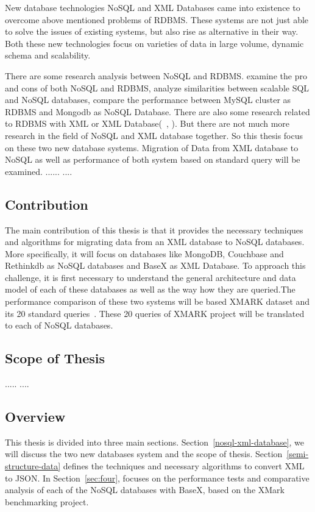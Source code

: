 \documentclass[a4paper,12pt]{article}
\begin{document}
			New database technologies  NoSQL and  XML Databases came into existence to overcome above mentioned problems of RDBMS. These systems are not just able to solve the issues of existing systems, but also rise as alternative in their way. Both these new technologies focus on varieties of data in large volume, dynamic schema and scalability.
			
			There are some research analysis between NoSQL and RDBMS. \cite{nance2013nosql} examine the pro and cons of both NoSQL and RDBMS, \cite{cattell2011scalable} analyze similarities between scalable SQL and NoSQL databases, \cite{hadjigeorgiou2013rdbms}  compare the performance between MySQL cluster as RDBMS and Mongodb as NoSQL Database.  There are also some research related to RDBMS with XML or XML Database(~\citet{jiang2002xparent}, \citet{shanmugasundaram1999relational}). But there are not much more research in the field of NoSQL and XML database together. So this thesis focus on these two new database systems. Migration of Data from XML database to NoSQL as well as performance of both system based on standard query will be examined.
			......
			....
	
	\subsection{Contribution}
		The main contribution of this thesis is that it provides the necessary techniques and algorithms for migrating data from an XML database to NoSQL databases.  More specifically, it will focus on databases like MongoDB, Couchbase and Rethinkdb as NoSQL databases and BaseX as XML Database. To approach this challenge, it is first necessary to understand the general architecture and data model of each of these databases as well as the way how they are queried.The performance comparison of these two systems will be based XMARK dataset and its 20 standard queries~\citep{xmark/original}. These 20 queries of XMARK project will be translated to each of NoSQL databases.
		
	\subsection{Scope of Thesis}
	.....
	....
	\subsection{Overview}
		This thesis is divided into three main sections. Section~\ref{nosql-xml-database}, we will discuss the two new databases system and the scope of thesis. Section~\ref{semi-structure-data} defines the techniques and necessary algorithms to convert XML  to JSON. In Section~\ref{sec:four}, focuses on the performance tests and comparative analysis of each of the NoSQL databases with BaseX, based on the XMark benchmarking project.		
			
\end{document}
